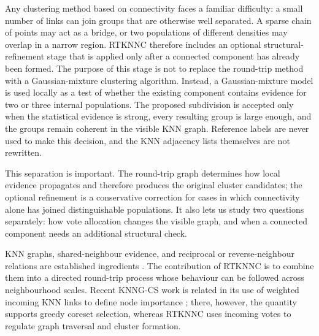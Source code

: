 \documentclass[review,12pt]{elsarticle}
\begin{document}
Any clustering method based on connectivity faces a familiar difficulty: a
small number of links can join groups that are otherwise well separated. A
sparse chain of points may act as a bridge, or two populations of different
densities may overlap in a narrow region. RTKNNC therefore includes an optional
structural-refinement stage that is applied only after a connected component
has already been formed. The purpose of this stage is not to replace the
round-trip method with a Gaussian-mixture clustering algorithm. Instead, a
Gaussian-mixture model is used locally as a test of whether the existing
component contains evidence for two or three internal populations. The proposed
subdivision is accepted only when the statistical evidence is strong, every
resulting group is large enough, and the groups remain coherent in the visible
KNN graph. Reference labels are never used to make this decision, and the KNN
adjacency lists themselves are not rewritten.

This separation is important. The round-trip graph determines how local
evidence propagates and therefore produces the original cluster candidates; the
optional refinement is a conservative correction for cases in which connectivity
alone has joined distinguishable populations. It also lets us study two
questions separately: how vote allocation changes the visible graph, and when a
connected component needs an additional structural check.

KNN graphs, shared-neighbour evidence, and reciprocal or reverse-neighbour
relations are established ingredients
\citep{JarvisPatrick1973,Ertoz2003SNN,BritoChavezQuirozYukich1997,ChowdhuryAmorim2018,XieLeeWangChenZhou2019}.
The contribution of RTKNNC is to combine them into a directed round-trip
process whose behaviour can be followed across neighbourhood scales. Recent
KNNG-CS work is related in its use of weighted incoming KNN links to define node
importance \citep{LiuEtAl2026KNNGCS}; there, however, the quantity supports
greedy coreset selection, whereas RTKNNC uses incoming votes to regulate graph
traversal and cluster formation.
\end{document}
